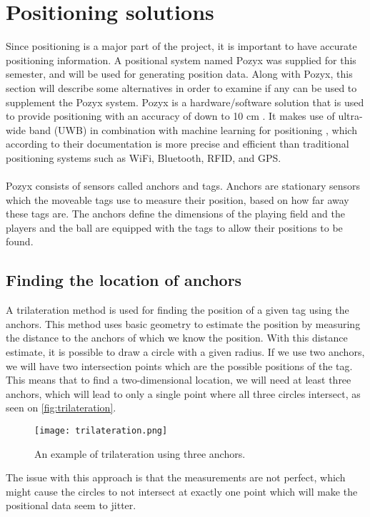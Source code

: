 \section{Positioning solutions}\label{sec:sprint1-pozyx}
Since positioning is a major part of the project, it is important to have accurate positioning information.
A positional system named Pozyx was supplied for this semester, and will be used for generating position data.
Along with Pozyx, this section will describe some alternatives in order to examine if any can be used to supplement the Pozyx system.
Pozyx is a hardware/software solution that is used to provide positioning with an accuracy of down to 10 cm \cite{pozyx}.
It makes use of ultra-wide band (UWB) in combination with machine learning for positioning \cite{pozyx}, which according to their documentation is more precise and efficient than traditional positioning systems such as WiFi, Bluetooth, RFID, and GPS.
\\\\
Pozyx consists of sensors called anchors and tags.
Anchors are stationary sensors which the moveable tags use to measure their position, based on how far away these tags are. 
The anchors define the dimensions of the playing field and the players and the ball are equipped with the tags to allow their positions to be found.

\subsection{Finding the location of anchors}
A trilateration method is used for finding the position of a given tag using the anchors.
This method uses basic geometry to estimate the position by measuring the distance to the anchors of which we know the position.
With this distance estimate, it is possible to draw a circle with a given radius.
If we use two anchors, we will have two intersection points which are the possible positions of the tag.
This means that to find a two-dimensional location, we will need at least three anchors, which will lead to only a single point where all three circles intersect, as seen on \autoref{fig:trilateration}.

\begin{figure}[H]
    \centering
    \texttt{[image: trilateration.png]}
    \caption{An example of trilateration using three anchors.}
    \label{fig:trilateration}
\end{figure}

\noindent
The issue with this approach is that the measurements are not perfect, which might cause the circles to not intersect at exactly one point which will make the positional data seem to jitter.

